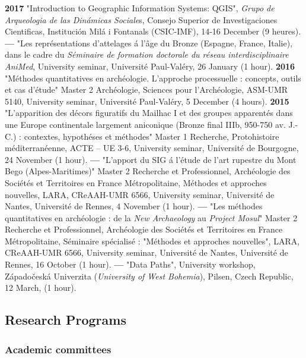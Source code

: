 \documentclass{article}
\begin{document}
\textbf{2017 }"Introduction to Geographic Information Systems: QGIS", \textit{Grupo de Arqueologia de las Din\'{a}micas Sociale}s, Consejo Superior de Investigaciones Cientificas, Instituci\'{o}n Mil\'{a} i Fontanals (CSIC-IMF), 14-16 December (9 heures).
\smallbreak
\textbf{---  }"Les repr\'{e}sentations d'attelages \'{a} l'\^{a}ge du Bronze (Espagne, France, Italie), dans le cadre du \textit{S\'{e}minaire de formation doctorale du r\'{e}seau interdisciplinaire AniMed}, University seminar, Universit\'{e} Paul-Val\'{e}ry, 26 January (1 hour).
\smallbreak
\textbf{2016 }"M\'{e}thodes quantitatives en arch\'{e}ologie. L'approche processuelle : concepts, outils et cas d'\'{e}tude" Master 2 Arch\'{e}ologie, Sciences pour l'Arch\'{e}ologie, ASM-UMR 5140, University seminar, Universit\'{e} Paul-Val\'{e}ry, 5 December (4 hours).
\smallbreak
\textbf{2015 }"L'apparition des d\'{e}cors figuratifs du Mailhac I et des groupes apparent\'{e}s dans une Europe continentale largement aniconique (Bronze final IIIb, 950-750 av. J.-C.) : contextes, hypoth\'{e}ses et m\'{e}thodes" Master 1 Recherche, Protohistoire m\'{e}diterran\'{e}enne, ACTE -- UE 3-6, University seminar, Universit\'{e} de Bourgogne, 24 November (1 hour).
\smallbreak
\textbf{---  }"L'apport du SIG \'{a} l'\'{e}tude de l'art rupestre du Mont Bego (Alpes-Maritimes)" Master 2 Recherche et Professionnel, Arch\'{e}ologie des Soci\'{e}t\'{e}s et Territoires en France M\'{e}tropolitaine, M\'{e}thodes et approches nouvelles, LARA, CReAAH-UMR 6566, University seminar, Universit\'{e} de Nantes, Universit\'{e} de Rennes, 4 November (1 hour).
\smallbreak
\textbf{---  }"Les m\'{e}thodes quantitatives en arch\'{e}ologie : de la \textit{New Archaeology} au \textit{Project Mosul}" Master 2 Recherche et Professionnel, Arch\'{e}ologie des Soci\'{e}t\'{e}s et Territoires en France M\'{e}tropolitaine, S\'{e}minaire sp\'{e}cialis\'{e} : "M\'{e}thodes et approches nouvelles", LARA, CReAAH-UMR 6566, University seminar, Universit\'{e} de Nantes, Universit\'{e} de Rennes, 16 October (1 hour).
\smallbreak
\textbf{---  }"Data Paths", University workshop, Z\'{a}pado\v{c}esk\'{a} Univerzita (\textit{University of West Bohemia}), Pilsen, Czech Republic, 12 March, (1 hour).

\subsection*{Research Programs}

\subsubsection*{Academic committees}
\end{document}
